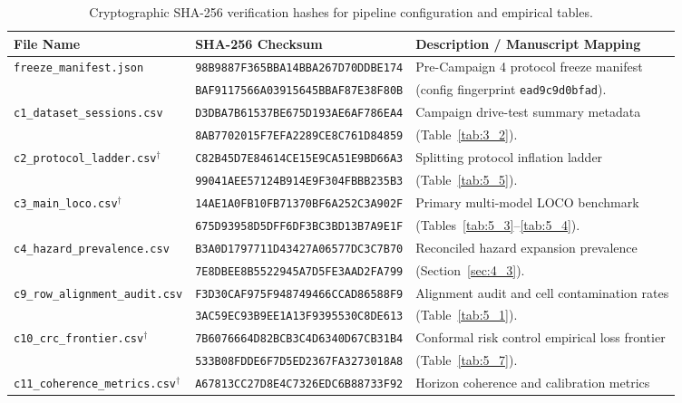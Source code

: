\begin{table}[htbp]
\centering
\caption{Cryptographic SHA-256 verification hashes for pipeline configuration and empirical tables.}
\label{tab:C_checksums}
\vspace{0.4em}
\singlespacing
\footnotesize
\begin{tabularx}{\linewidth}{l l X}
\toprule
\textbf{File Name} & \textbf{SHA-256 Checksum} & \textbf{Description / Manuscript Mapping} \\
\midrule
\texttt{freeze\_manifest.json} & \texttt{98B9887F365BBA14BBA267D70DDBE174} & Pre-Campaign 4 protocol freeze manifest \\
& \texttt{BAF9117566A03915645BBAF87E38F80B} & (config fingerprint \texttt{ead9c9d0bfad}). \\
\texttt{c1\_dataset\_sessions.csv} & \texttt{D3DBA7B61537BE675D193AE6AF786EA4} & Campaign drive-test summary metadata \\
& \texttt{8AB7702015F7EFA2289CE8C761D84859} & (Table~\ref{tab:3_2}). \\
\texttt{c2\_protocol\_ladder.csv}$^{\dagger}$ & \texttt{C82B45D7E84614CE15E9CA51E9BD66A3} & Splitting protocol inflation ladder \\
& \texttt{99041AEE57124B914E9F304FBBB235B3} & (Table~\ref{tab:5_5}). \\
\texttt{c3\_main\_loco.csv}$^{\dagger}$ & \texttt{14AE1A0FB10FB71370BF6A252C3A902F} & Primary multi-model LOCO benchmark \\
& \texttt{675D93958D5DFF6DF3BC3BD13B7A9E1F} & (Tables~\ref{tab:5_3}--\ref{tab:5_4}). \\
\texttt{c4\_hazard\_prevalence.csv} & \texttt{B3A0D1797711D43427A06577DC3C7B70} & Reconciled hazard expansion prevalence \\
& \texttt{7E8DBEE8B5522945A7D5FE3AAD2FA799} & (Section~\ref{sec:4_3}). \\
\texttt{c9\_row\_alignment\_audit.csv} & \texttt{F3D30CAF975F948749466CCAD86588F9} & Alignment audit and cell contamination rates \\
& \texttt{3AC59EC93B9EE1A13F9395530C8DE613} & (Table~\ref{tab:5_1}). \\
\texttt{c10\_crc\_frontier.csv}$^{\dagger}$ & \texttt{7B6076664D82BCB3C4D6340D67CB31B4} & Conformal risk control empirical loss frontier \\
& \texttt{533B08FDDE6F7D5ED2367FA3273018A8} & (Table~\ref{tab:5_7}). \\
\texttt{c11\_coherence\_metrics.csv}$^{\dagger}$ & \texttt{A67813CC27D8E4C7326EDC6B88733F92} & Horizon coherence and calibration metrics \\

\end{tabularx}
\end{table}
